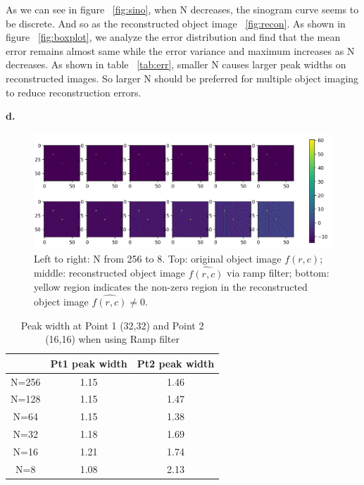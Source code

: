 \documentclass[11pt,a4paper]{article}
\begin{document}
As we can see in figure ~\ref{fig:sino}, when N decreases, the sinogram curve seems to be discrete. And so as the reconstructed object image ~\ref{fig:recon}. As shown in figure ~\ref{fig:boxplot}, we analyze the error distribution and find that the mean error remains almost same while the error variance and maximum increases as N decreases. As shown in table ~\ref{tab:err}, smaller N causes larger peak widths on reconstructed images. So larger N should be preferred for multiple object imaging to reduce reconstruction errors. 

\textbf{d.}
\begin{figure}[!htp]
    \centering
    \includegraphics[width=\linewidth]{HW2_Q3_4.1.png}
    \caption{Left to right: N from 256 to 8.
        Top: original object image $f(r,c)$; middle: reconstructed object image $\widehat{f(r,c)}$ via ramp filter; bottom: yellow region indicates the non-zero region in the reconstructed object image $\widehat{f(r,c)}\ne 0$.}
    \label{fig:recon2}
\end{figure}

\begin{table}[!htp]
    \centering
    \begin{tabular}{c||c|c}
        \hline
        & Pt1 peak width & Pt2 peak width\\
        \hline
        N=256 & 1.15 & 1.46\\
        N=128 & 1.15 & 1.47\\
        N=64  &  1.15 & 1.38\\
        N=32 &  1.18 & 1.69\\
        N=16 & 1.21 & 1.74 \\
        N=8  & 1.08 & 2.13 \\
        \hline
    \end{tabular}
    \caption{Peak width at Point 1 (32,32) and Point 2 (16,16) when using Ramp filter}
    \label{tab:err_ramp}
    \end{table}
\end{document}
